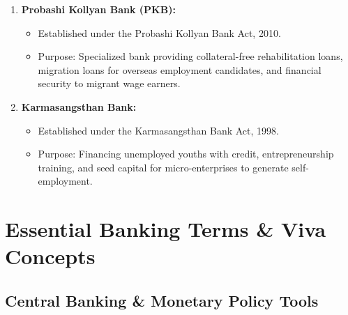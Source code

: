 \begin{enumerate}
\begin{itemize}
    \item Chairman: Professor Abu Ahmed; Managing Director: Niranjan Chandra Debnath.
    \item Role: The apex national non-bank capital market institution. Functions include underwriting shares, managing mutual funds, acting as debenture trustee, stock market stabilization, and investor portfolio management.
    \item Subsidiaries: ICB Capital Management Ltd., ICB Asset Management Company Ltd., and ICB Securities Trading Company Ltd.
  \end{itemize}
  \item \textbf{Probashi Kollyan Bank (PKB):}
  \begin{itemize}
    \item Established under the Probashi Kollyan Bank Act, 2010.
    \item Purpose: Specialized bank providing collateral-free rehabilitation loans, migration loans for overseas employment candidates, and financial security to migrant wage earners.
  \end{itemize}
  \item \textbf{Karmasangsthan Bank:}
  \begin{itemize}
    \item Established under the Karmasangsthan Bank Act, 1998.
    \item Purpose: Financing unemployed youths with credit, entrepreneurship training, and seed capital for micro-enterprises to generate self-employment.
  \end{itemize}
\end{enumerate}

\medskip

\section{Essential Banking Terms \& Viva Concepts}

\subsection{Central Banking \& Monetary Policy Tools}

